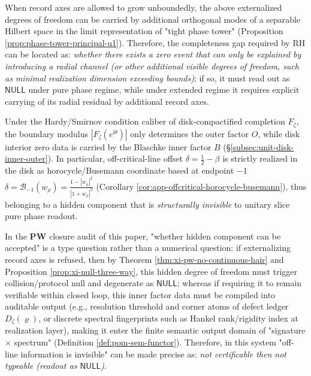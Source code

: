 \begin{remark}
When record axes are allowed to grow unboundedly, the above externalized degrees of freedom can be carried by additional orthogonal modes of a separable Hilbert space in the limit representation of "tight phase tower" (Proposition \ref{prop:phase-tower-principal-u1}).
Therefore, the completeness gap required by RH can be located as: \emph{whether there exists a zero event that can only be explained by introducing a radial channel (or other additional visible degrees of freedom, such as minimal realization dimension exceeding bounds)}; if so, it must read out as \(\mathsf{NULL}\) under pure phase regime, while under extended regime it requires explicit carrying of its radial residual by additional record axes.
\end{remark}

\begin{remark}\label{rem:xi-inner-factor-auditability-null}
Under the Hardy/Smirnov condition caliber of disk-compactified completion \(F_{\zeta}\), the boundary modulus \(|F_{\zeta}(e^{\mathrm{i}\theta})|\) only determines the outer factor \(O\), while disk interior zero data is carried by the Blaschke inner factor \(B\) (\S\ref{subsec:unit-disk-inner-outer}).
In particular, off-critical-line offset \(\delta=\tfrac12-\beta\) is strictly realized in the disk as horocycle/Busemann coordinate based at endpoint \(-1\)
\(
\delta=\mathcal{B}_{-1}(w_{\rho})=\frac{1-|w_{\rho}|^{2}}{|1+w_{\rho}|^{2}}
\)
(Corollary \ref{cor:app-offcritical-horocycle-busemann}), thus belonging to a hidden component that is \emph{structurally invisible} to unitary slice pure phase readout.
\par
In the \(\mathbf{PW}\) closure audit of this paper, "whether hidden component can be accepted" is a type question rather than a numerical question: if externalizing record axes is refused, then by Theorem \ref{thm:xi-pw-no-continuous-hair} and Proposition \ref{prop:xi-null-three-way}, this hidden degree of freedom must trigger collision/protocol null and degenerate as \(\mathsf{NULL}\); whereas if requiring it to remain verifiable within closed loop, this inner factor data must be compiled into auditable output (e.g., resolution threshold and corner atoms of defect ledger \(D_{\zeta}(\varrho)\), or discrete spectral fingerprints such as Hankel rank/rigidity index at realization layer), making it enter the finite semantic output domain of "signature \(\times\) spectrum" (Definition \ref{def:pom-sem-functor}).
Therefore, in this system "off-line information is invisible" can be made precise as: \emph{not certificable then not typeable (readout as \(\mathsf{NULL}\))}.
\end{remark}

